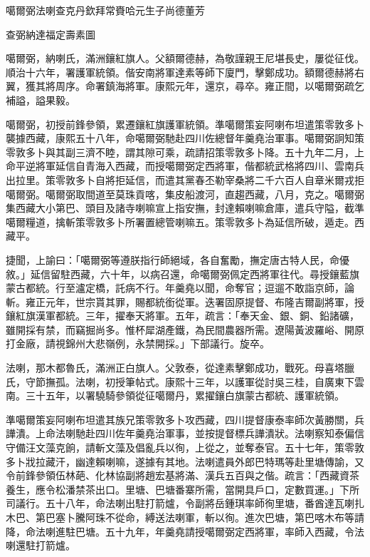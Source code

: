 
\begin{pinyinscope}
噶爾弼法喇查克丹欽拜常賚哈元生子尚德董芳

查弼納達福定壽素圖

噶爾弼，納喇氏，滿洲鑲紅旗人。父額爾德赫，為敬謹親王尼堪長史，屢從征伐。順治十六年，署護軍統領。偕安南將軍達素等師下廈門，擊鄭成功。額爾德赫將右翼，獲其將周序。命署鎮海將軍。康熙元年，還京，尋卒。雍正間，以噶爾弼疏乞補謚，謚果毅。

噶爾弼，初授前鋒參領，累遷鑲紅旗護軍統領。準噶爾策妄阿喇布坦遣策零敦多卜襲據西藏，康熙五十八年，命噶爾弼馳赴四川佐總督年羹堯治軍事。噶爾弼詗知策零敦多卜與其副三濟不睦，謂其隙可乘，疏請招策零敦多卜降。五十九年二月，上命平逆將軍延信自青海入西藏，而授噶爾弼定西將軍，偕都統武格將四川、雲南兵出拉里。策零敦多卜自將拒延信，而遣其黨春丕勒宰桑將二千六百人自章米爾戎拒噶爾弼。噶爾弼取間道至莫珠貢喀，集皮船渡河，直趨西藏，八月，克之。噶爾弼集西藏大小第巴、頭目及諸寺喇嘛宣上指安撫，封達賴喇嘛倉庫，遣兵守隘，截準噶爾糧道，擒斬策零敦多卜所署置總管喇嘛五。策零敦多卜為延信所破，遁走。西藏平。

捷聞，上諭曰：「噶爾弼等遵朕指行師絕域，各自奮勵，撫定唐古特人民，命優敘。」延信留駐西藏，六十年，以病召還，命噶爾弼佩定西將軍往代。尋授鑲藍旗蒙古都統。行至瀘定橋，託病不行。年羹堯以聞，命奪官；逗遛不敢詣京師，論斬。雍正元年，世宗貰其罪，賜都統銜從軍。迭署固原提督、布隆吉爾副將軍，授鑲紅旗漢軍都統。三年，擢奉天將軍。五年，疏言：「奉天金、銀、銅、鉛諸礦，雖開採有禁，而竊掘尚多。惟杯犀湖產鐵，為民間農器所需。遼陽黃波羅峪、開原打金廠，請視錦州大悲嶺例，永禁開採。」下部議行。旋卒。

法喇，那木都魯氏，滿洲正白旗人。父敦泰，從達素擊鄭成功，戰死。母喜塔臘氏，守節撫孤。法喇，初授筆帖式。康熙十三年，以護軍從討吳三桂，自廣東下雲南。三十五年，以署驍騎參領從征噶爾丹，累擢鑲白旗蒙古都統、護軍統領。

準噶爾策妄阿喇布坦遣其族兄策零敦多卜攻西藏，四川提督康泰率師次黃勝關，兵譁潰。上命法喇馳赴四川佐年羹堯治軍事，並按提督標兵譁潰狀。法喇察知泰偏信守備汪文藻克餉，請斬文藻及倡亂兵以徇，上從之，並奪泰官。五十七年，策零敦多卜戕拉藏汗，幽達賴喇嘛，遂據有其地。法喇遣員外郎巴特瑪等赴里塘傳諭，又令前鋒參領伍林葩、化林協副將趙宏基將滿、漢兵五百與之偕。疏言：「西藏資茶養生，應令松潘禁茶出口。里塘、巴塘番寨所需，當開具戶口，定數買運。」下所司議行。五十八年，命法喇出駐打箭爐，令副將岳鍾琪率師徇里塘，番酋達瓦喇扎木巴、第巴塞卜騰阿珠不從命，縛送法喇軍，斬以徇。進次巴塘，第巴喀木布等請降，命法喇進駐巴塘。五十九年，年羹堯請授噶爾弼定西將軍，率師入西藏，令法喇還駐打箭爐。


\end{pinyinscope}
